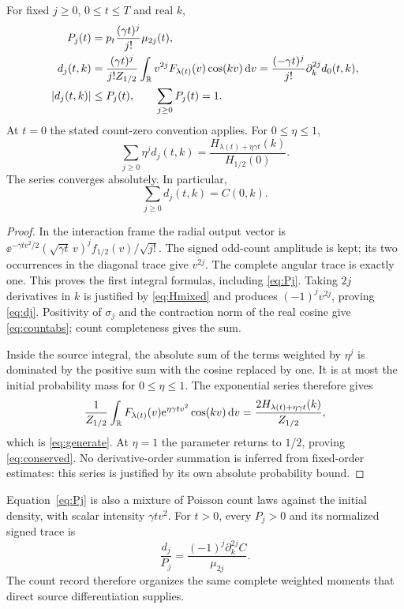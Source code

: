 \begin{theorem}\label{thm:counts}
For fixed $j\ge0$, $0\le t\le T$ and real $k$,
\begin{align}
 P_j(t)&=p_t\frac{(\gamma t)^j}{j!}\mu_{2j}(t),\label{eq:Pj}\\
 d_j(t,k)&=\frac{(\gamma t)^j}{j!Z_{1/2}}
      \int_\mathbb R v^{2j}F_{\lambda(t)}(v)\cos(kv)\,\mathrm d v
       =\frac{(-\gamma t)^j}{j!}\partial_k^{2j}d_0(t,k),\label{eq:dj}\\
 |d_j(t,k)|&\le P_j(t),\qquad\sum_{j\ge0}P_j(t)=1.\label{eq:countabs}
\end{align}
At $t=0$ the stated count-zero convention applies. For $0\le\eta\le1$,
\begin{equation}\label{eq:generate}
 \sum_{j\ge0}\eta^jd_j(t,k)
 =\frac{H_{\lambda(t)+\eta\gamma t}(k)}{H_{1/2}(0)}.
\end{equation}
The series converges absolutely. In particular,
\begin{equation}\label{eq:conserved}
 \sum_{j\ge0}d_j(t,k)=C(0,k).
\end{equation}
\end{theorem}
\begin{proof}
In the interaction frame the radial output vector is
$\ee^{-\gamma tv^2/2}(\sqrt{\gamma t}\,v)^jf_{1/2}(v)/\sqrt{j!}$.
The signed odd-count amplitude is kept; its two occurrences in the diagonal
trace give $v^{2j}$. The complete angular trace is exactly one. This proves
the first integral formulas, including \eqref{eq:Pj}. Taking $2j$ derivatives
in $k$ is justified by \eqref{eq:Hmixed} and produces $(-1)^jv^{2j}$,
proving \eqref{eq:dj}. Positivity of $\sigma_j$ and the contraction norm of
the real cosine give \eqref{eq:countabs}; count completeness gives the sum.

Inside the source integral, the absolute sum of the terms weighted by
$\eta^j$ is dominated by the positive sum with the cosine replaced by one.
It is at most the initial probability mass for $0\le\eta\le1$.
The exponential series therefore gives
\[
 \frac1{Z_{1/2}}\int_\mathbb R F_{\lambda(t)}(v)
        \mathrm e^{\eta\gamma tv^2}\cos(kv)\,\mathrm d v
 =\frac{2H_{\lambda(t)+\eta\gamma t}(k)}{Z_{1/2}},
\]
which is \eqref{eq:generate}. At $\eta=1$ the parameter returns to $1/2$,
proving \eqref{eq:conserved}. No derivative-order summation is inferred
from fixed-order estimates: this series is justified by its own absolute
probability bound.
\end{proof}

Equation~\eqref{eq:Pj} is also a mixture of Poisson count laws against the
initial density, with scalar intensity $\gamma tv^2$. For $t>0$, every
$P_j>0$ and its normalized signed trace is
\begin{equation}\label{eq:conditionalj}
 \frac{d_j}{P_j}=\frac{(-1)^j\partial_k^{2j}C}{\mu_{2j}}.
\end{equation}
The count record therefore organizes the same complete weighted moments
that direct source differentiation supplies.

